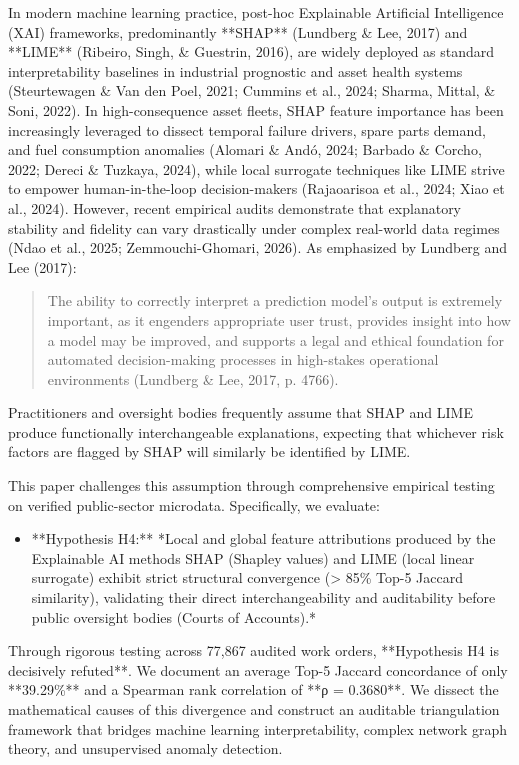 \documentclass[10pt,a4paper,journal]{article}
\begin{document}
In modern machine learning practice, post-hoc Explainable Artificial Intelligence (XAI) frameworks, predominantly **SHAP** (Lundberg \& Lee, 2017) and **LIME** (Ribeiro, Singh, \& Guestrin, 2016), are widely deployed as standard interpretability baselines in industrial prognostic and asset health systems (Steurtewagen \& Van den Poel, 2021; Cummins et al., 2024; Sharma, Mittal, \& Soni, 2022). In high-consequence asset fleets, SHAP feature importance has been increasingly leveraged to dissect temporal failure drivers, spare parts demand, and fuel consumption anomalies (Alomari \& Andó, 2024; Barbado \& Corcho, 2022; Dereci \& Tuzkaya, 2024), while local surrogate techniques like LIME strive to empower human-in-the-loop decision-makers (Rajaoarisoa et al., 2024; Xiao et al., 2024). However, recent empirical audits demonstrate that explanatory stability and fidelity can vary drastically under complex real-world data regimes (Ndao et al., 2025; Zemmouchi-Ghomari, 2026). As emphasized by Lundberg and Lee (2017):

\begin{quote}
\small The ability to correctly interpret a prediction model's output is extremely important, as it engenders appropriate user trust, provides insight into how a model may be improved, and supports a legal and ethical foundation for automated decision-making processes in high-stakes operational environments (Lundberg \& Lee, 2017, p. 4766).
\end{quote}
Practitioners and oversight bodies frequently assume that SHAP and LIME produce functionally interchangeable explanations, expecting that whichever risk factors are flagged by SHAP will similarly be identified by LIME.

This paper challenges this assumption through comprehensive empirical testing on verified public-sector microdata. Specifically, we evaluate:

\begin{itemize}
\item **Hypothesis H4:** *Local and global feature attributions produced by the Explainable AI methods SHAP (Shapley values) and LIME (local linear surrogate) exhibit strict structural convergence (> 85\% Top-5 Jaccard similarity), validating their direct interchangeability and auditability before public oversight bodies (Courts of Accounts).*
\end{itemize}
Through rigorous testing across 77,867 audited work orders, **Hypothesis H4 is decisively refuted**. We document an average Top-5 Jaccard concordance of only **39.29\%** and a Spearman rank correlation of **ρ = 0.3680**. We dissect the mathematical causes of this divergence and construct an auditable triangulation framework that bridges machine learning interpretability, complex network graph theory, and unsupervised anomaly detection.
\end{document}
